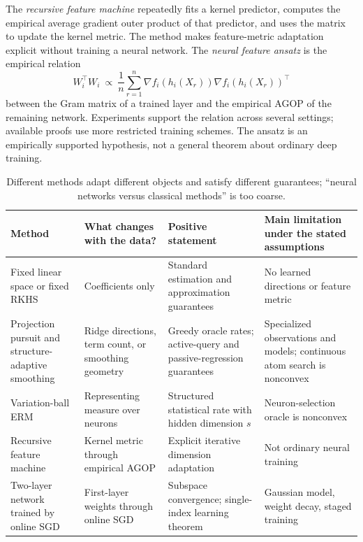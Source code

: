 \documentclass[11pt,twoside]{article}
\theoremstyle{definition}
\theoremstyle{remark}
\begin{document}
The \emph{recursive feature machine} repeatedly fits a kernel predictor,
computes the empirical average gradient outer product of that predictor, and
uses the matrix to update the kernel metric. The method makes feature-metric
adaptation explicit without training a neural network. The \emph{neural
feature ansatz} is the empirical relation
\begin{equation}
 W_i^\top W_i
 \ \propto\
 \frac1n\sum_{r=1}^n
 \nabla f_i(h_i(X_r))\nabla f_i(h_i(X_r))^\top
 \label{eq:nfa}
\end{equation}
between the Gram matrix of a trained layer and the empirical AGOP of the
remaining network. Experiments support the relation across several settings;
available proofs use more restricted training schemes. The ansatz is an
empirically supported hypothesis, not a general theorem about ordinary deep
training.

\begin{table}[ht]
\centering
\small
\begin{tabular}{@{}>{\raggedright\arraybackslash}p{}
  >{\raggedright\arraybackslash}p{0.26\textwidth}
  >{\raggedright\arraybackslash}p{}
  >{\raggedright\arraybackslash}p{}@{}}
\toprule
Method & What changes with the data? & Positive statement & Main limitation under the stated assumptions \\
\midrule
Fixed linear space or fixed RKHS
& Coefficients only
& Standard estimation and approximation guarantees
& No learned directions or feature metric \\
Projection pursuit and structure-adaptive smoothing
& Ridge directions, term count, or smoothing geometry
& Greedy oracle rates; active-query and passive-regression guarantees
& Specialized observations and models; continuous atom search is nonconvex \\
Variation-ball ERM
& Representing measure over neurons
& Structured statistical rate with hidden dimension $s$
& Neuron-selection oracle is nonconvex \\
Recursive feature machine
& Kernel metric through empirical AGOP
& Explicit iterative dimension adaptation
& Not ordinary neural training \\
Two-layer network trained by online SGD
& First-layer weights through online SGD
& Subspace convergence; single-index learning theorem
& Gaussian model, weight decay, staged training \\
\bottomrule
\end{tabular}
\caption{Different methods adapt different objects and satisfy different
guarantees; ``neural networks versus classical methods'' is too coarse.}
\label{tab:method-comparison}
\end{table}
\end{document}
